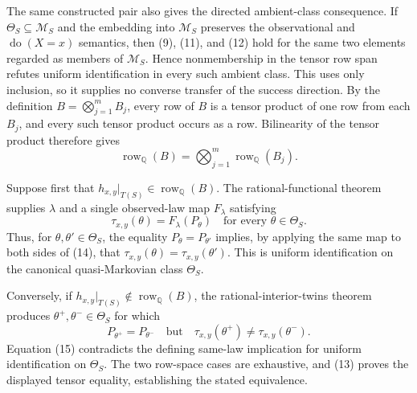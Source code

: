 The same constructed pair also gives the directed ambient-class consequence.  If \(\Theta_S\subseteq\mathcal M_S\) and the embedding into \(\mathcal M_S\) preserves the observational and \(\operatorname{do}(X=x)\) semantics, then (9), (11), and (12) hold for the same two elements regarded as members of \(\mathcal M_S\).  Hence nonmembership in the tensor row span refutes uniform identification in every such ambient class.  This uses only inclusion, so it supplies no converse transfer of the success direction.
By the definition \(B=\bigotimes_{j=1}^mB_j\), every row of \(B\) is a tensor product of one row from each \(B_j\), and every such tensor product occurs as a row.  Bilinearity of the tensor product therefore gives
\[
\operatorname{row}_{\mathbb Q}(B)
=\bigotimes_{j=1}^m\operatorname{row}_{\mathbb Q}(B_j).       \tag{13}
\]

Suppose first that \(h_{x,y}|_{T(S)}\in\operatorname{row}_{\mathbb Q}(B)\).  The rational-functional theorem supplies \(\lambda\) and a single observed-law map \(F_\lambda\) satisfying
\[
\tau_{x,y}(\theta)=F_\lambda(P_\theta)
\quad\text{for every }\theta\in\Theta_S.                    \tag{14}
\]
Thus, for \(\theta,\theta'\in\Theta_S\), the equality \(P_\theta=P_{\theta'}\) implies, by applying the same map to both sides of (14), that \(\tau_{x,y}(\theta)=\tau_{x,y}(\theta')\).  This is uniform identification on the canonical quasi-Markovian class \(\Theta_S\).

Conversely, if \(h_{x,y}|_{T(S)}\notin\operatorname{row}_{\mathbb Q}(B)\), the rational-interior-twins theorem produces \(\theta^+,\theta^-\in\Theta_S\) for which
\[
P_{\theta^+}=P_{\theta^-}
\quad\text{but}\quad
\tau_{x,y}(\theta^+)\ne\tau_{x,y}(\theta^-).                \tag{15}
\]
Equation (15) contradicts the defining same-law implication for uniform identification on \(\Theta_S\).  The two row-space cases are exhaustive, and (13) proves the displayed tensor equality, establishing the stated equivalence.

